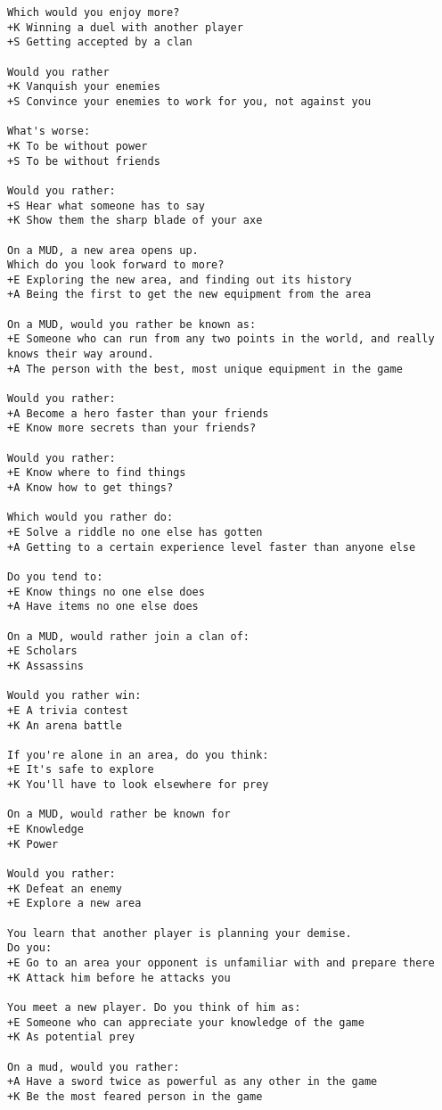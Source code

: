 \begin{verbatim}
Which would you enjoy more?
+K Winning a duel with another player
+S Getting accepted by a clan

Would you rather
+K Vanquish your enemies
+S Convince your enemies to work for you, not against you

What's worse:
+K To be without power
+S To be without friends

Would you rather:
+S Hear what someone has to say
+K Show them the sharp blade of your axe

On a MUD, a new area opens up.
Which do you look forward to more?
+E Exploring the new area, and finding out its history
+A Being the first to get the new equipment from the area

On a MUD, would you rather be known as:
+E Someone who can run from any two points in the world, and really knows their way around.
+A The person with the best, most unique equipment in the game

Would you rather:
+A Become a hero faster than your friends
+E Know more secrets than your friends?

Would you rather:
+E Know where to find things
+A Know how to get things?

Which would you rather do:
+E Solve a riddle no one else has gotten
+A Getting to a certain experience level faster than anyone else

Do you tend to:
+E Know things no one else does
+A Have items no one else does

On a MUD, would rather join a clan of:
+E Scholars
+K Assassins

Would you rather win:
+E A trivia contest
+K An arena battle

If you're alone in an area, do you think:
+E It's safe to explore
+K You'll have to look elsewhere for prey

On a MUD, would rather be known for
+E Knowledge
+K Power

Would you rather:
+K Defeat an enemy
+E Explore a new area

You learn that another player is planning your demise.
Do you:
+E Go to an area your opponent is unfamiliar with and prepare there
+K Attack him before he attacks you

You meet a new player. Do you think of him as:
+E Someone who can appreciate your knowledge of the game
+K As potential prey

On a mud, would you rather:
+A Have a sword twice as powerful as any other in the game
+K Be the most feared person in the game


\end{verbatim}
